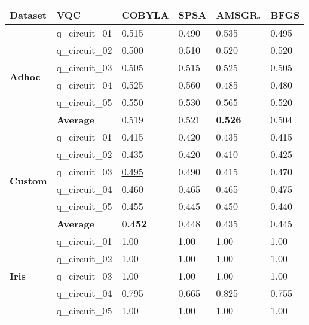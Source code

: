 \begin{table}[!h]
	\centering
	        
	\begin{tabular}{p{}p{}|p{}p{}p{}p{}}
		\hline 
		\textbf{Dataset}        & \textbf{VQC} & \textbf{COBYLA} & \textbf{SPSA}  & \textbf{AMSGR.} & \textbf{BFGS} \\
		\hline 
		\multirow{6}{*}{\textbf{Adhoc}}  & q\_circuit\_01 & 0.515  & 0.490 & 0.535    & 0.495 \\
		                        & q\_circuit\_02 & 0.500  & 0.510 & 0.520    & 0.520 \\
		                        & q\_circuit\_03 & 0.505  & 0.515 & 0.525    & 0.505 \\
		                        & q\_circuit\_04 & 0.525  & 0.560 & 0.485    & 0.480 \\
		                        & q\_circuit\_05 & 0.550  & 0.530 & \underline{0.565}    & 0.520 \\
		\cline{2-6} 
		                        & \textbf{Average}      & 0.519  & 0.521 & \textbf{0.526}    & 0.504 \\
		\hline 
		\multirow{6}{*}{\textbf{Custom}} & q\_circuit\_01 & 0.415  & 0.420 & 0.435    & 0.415 \\
		                        & q\_circuit\_02 & 0.435  & 0.420 & 0.410    & 0.425 \\
		                        & q\_circuit\_03 & \underline{0.495}  & 0.490 & 0.415    & 0.470 \\
		                        & q\_circuit\_04 & 0.460  & 0.465 & 0.465    & 0.475 \\
		                        & q\_circuit\_05 & 0.455  & 0.445 & 0.450    & 0.440 \\
		\cline{2-6} 
		                        & \textbf{Average}      & \textbf{0.452}  & 0.448 & 0.435    & 0.445 \\
		\hline 
		\multirow{6}{*}{\textbf{Iris}}   & q\_circuit\_01 & 1.00   & 1.00  & 1.00     & 1.00  \\
		                        & q\_circuit\_02 & 1.00   & 1.00  & 1.00     & 1.00  \\
		                        & q\_circuit\_03 & 1.00   & 1.00  & 1.00     & 1.00  \\
		                        & q\_circuit\_04 & 0.795  & 0.665 & 0.825    & 0.755 \\
		                        & q\_circuit\_05 & 1.00   & 1.00  & 1.00     & 1.00  \\

\end{tabular}
\end{table}
